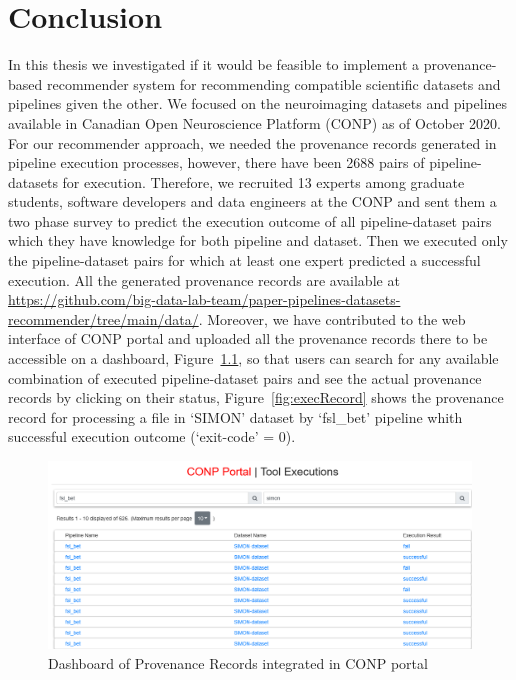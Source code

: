 \chapter{Conclusion}
\label{conclusion}

In this thesis we investigated if it would be feasible to implement a provenance-based recommender system for recommending compatible scientific datasets and pipelines given the other. We focused on the neuroimaging datasets and pipelines available in Canadian Open Neuroscience Platform (CONP) as of October 2020. For our recommender approach, we needed the provenance records generated in pipeline execution processes, however, there have been 2688 pairs of pipeline-datasets for execution. Therefore, we recruited 13 experts among graduate students, software developers and data engineers at the CONP and sent them a two phase survey to predict the execution outcome of all pipeline-dataset pairs which they have knowledge for both pipeline and dataset. Then we executed only the pipeline-dataset pairs for which at least one expert predicted a successful execution. All the generated provenance records are available at \url{https://github.com/big-data-lab-team/paper-pipelines-datasets-recommender/tree/main/data/}. Moreover, we have contributed to the web interface of CONP portal and uploaded all the provenance records there to be accessible on a dashboard, Figure~\ref{fig:dashProvenance}, so that users can search for any available combination of executed pipeline-dataset pairs and see the actual provenance records by clicking on their status, Figure~\ref{fig:execRecord} shows the provenance record for processing a file in `SIMON' dataset by `fsl\_bet' pipeline whith successful execution outcome (`exit-code' = 0).

\begin{figure}
    \centering
    \includegraphics[width=\textwidth,height=\textheight,keepaspectratio]{figures/executiondashboard.png}
    \caption{Dashboard of Provenance Records integrated in CONP portal}
    \label{fig:dashProvenance}
\end{figure}

